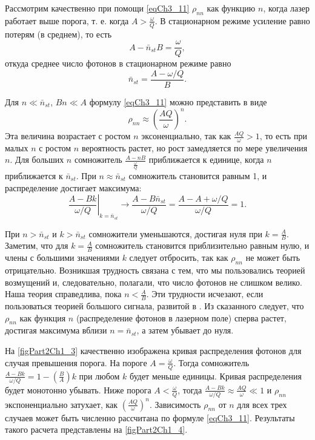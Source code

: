 Рассмотрим качественно при помощи \eqref{eqCh3_11} $\rho_{nn}$ как
функцию $n$, когда лазер работает выше порога, т. е. когда $A >
\frac{\omega}{Q}$. В стационарном режиме усиление равно потерям (в среднем), то есть 
\[
A - \bar{n}_{st}B = \frac{\omega}{Q},
\]
откуда среднее число фотонов в стационарном режиме равно
\[
\bar{n}_{st} = \frac{A - \omega/Q}{B}.
\] 

Для $n \ll \bar{n}_{st}$, $B n \ll A$ формулу \eqref{eqCh3_11} можно
представить в виде 
\[
\rho_{nn} \approx \left(\frac{A Q}{\omega}\right)^n.
\]
Эта величина возрастает с ростом $n$ эксоненциально, так как $\frac{A Q}{\omega} >
1$, то есть при малых $n$ с ростом $n$ вероятность растет, но рост 
замедляется по мере увеличения $n$.  Для больших $n$ сомножитель
$\frac{A - nB}{\frac{\omega}{Q}}$
приближается к единице, когда $n$ приближается к $\bar{n}_{st}$. 
При $n \approx \bar{n}_{st}$ сомножитель становится равным  1,  и
распределение достигает максимума: 
\[
\left.\frac{A - B k}{\omega/Q}\right|_{k = \bar{n}_{st}}
\rightarrow \frac{A - B \bar{n}_{st}}{\omega/Q} = 
\frac{A - A + \omega/Q}{\omega/Q} = 1.
\] 

При $n > \bar{n}_{st}$ и $k > \bar{n}_{st}$ сомножители уменьшаются,
достигая нуля при $k = \frac{A}{B}$. Заметим, 
что для $k = \frac{A}{B}$ сомножитель становится приблизительно равным
нулю, и члены с большими значениями $k$ следует отбросить, так как
$\rho_{nn}$ не может быть отрицательно. Возникшая трудность связана с
тем, что мы пользовались теорией возмущений и, следовательно,
полагали, что число фотонов не слишком велико. Наша теория
справедлива, пока $n < \frac{A}{B}$.  Эти трудности 
исчезают, если пользоваться теорией большого сигнала, развитой в
\cite{bScally1974}. Из сказанного следует, что $\rho_{nn}$ как
функция  $n$ (распределение фотонов в лазерном поле) сперва растет,
достигая максимума вблизи $n = \bar{n}_{st}$, а затем убывает до нуля.   



На \autoref{figPart2Ch1_3} качественно изображена кривая распределения
фотонов для 
случая превышения порога. На пороге $A = \frac{\omega}{Q}$.  Тогда
сомножитель $\frac{A - B k}{\omega/Q} = 1 - \left(\frac{B}{A}\right)k$
при любом $k$ будет меньше единицы. Кривая распределения будет монотонно
убывать. Ниже порога $A < \frac{\omega}{Q}$, тогда $\frac{A - B
  k}{\omega/Q} \approx \frac{A Q}{\omega} \ll 1$ и $\rho_{nn}$
экспоненциально затухает, как $\left(\frac{A
  Q}{\omega}\right)^n$. Зависимость $\rho_{nn}$ от $n$ для всех трех
случаев может быть численно рассчитана по формуле
\eqref{eqCh3_11}. Результаты такого расчета представлены на
\autoref{figPart2Ch1_4}. 

